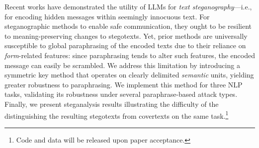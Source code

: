 Recent works have demonstrated the utility of LLMs for \emph{text steganography}---i.e., for encoding hidden messages within seemingly innocuous text. For steganographic methods to enable safe communication, they ought to be resilient to meaning-preserving changes to stegotexts. Yet, prior methods are universally susceptible to global paraphrasing of the encoded texts due to their reliance on \emph{form}-related features: since paraphrasing tends to alter such features, the encoded message can easily be scrambled. We address this limitation by introducing a symmetric key method that operates on clearly delimited \emph{semantic} units, yielding greater robustness to paraphrasing. We implement this method for three NLP tasks, validating its robustness under several paraphrase-based attack types. Finally, we present steganalysis results illustrating the difficulty of the distinguishing the resulting stegotexts from covertexts on the same task.\footnote{Code and data will be released upon paper acceptance.}

